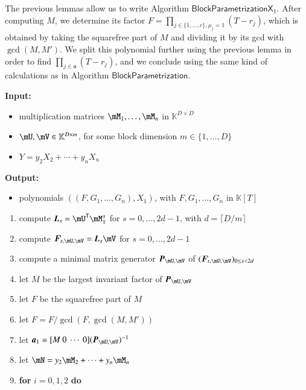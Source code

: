 \documentclass[final,1p,times,authoryear]{elsarticle}
\newcommand{\mat}[1]{\bm{\MakeUppercase{#1}}} %
\newcommand{\row}[1]{\bm{\MakeLowercase{#1}}} %
\newcommand{\seqelt}[1]{\bm{F}_{#1}} %
\newcommand{\mainalgoname}{\mathsf{ BlockParametrization}}
\newcommand{\mf}{Y}
\newcommand{\trsp}[1]{#1^{\mathsf{T}}} %
\def\K{\mathbb{K}}
\def\K {\ensuremath{\mathbb{K}}}
\newcommand{\mUt}{\trsp{\mU}}
\begin{document}
The previous lemmas allow us to write Algorithm
$\mathsf{BlockParametrizationX}_1$. After computing $M$, we determine its
factor $F=\prod_{j \in \{1,\dots,c\}, \mu_j=1} (T-r_j)$, which is
obtained by taking the squarefree part of $M$ and dividing it by
its gcd with $\gcd(M,M')$. We split this polynomial further using the previous
lemma in order to find $\prod_{j \in \mathfrak{a}} (T-r_j)$, and we
conclude using the same kind of calculations as in Algorithm
$\mainalgoname$.

\begin{algorithm}[ht]
  \caption{$\mainalgoname{\sf X}_1(\mM_1,\dots,\mM_n,\mU,\mV,\mf$)}
  {\bf Input:} \vspace{-0.5em}
  \begin{itemize}
    \item multiplication matrices $\mM_1,\dots,\mM_n$ in $\K^{D \times D}$
    \item  $\mU,\mV \in \mathbb{K}^{D \times m}$, for some block dimension  $m \in \{1,\dots,D\}$
    \item $\mf =y_2 X_2 + \cdots + y_n X_n$
  \end{itemize}
  {\bf Output:}  \vspace{-0.5em}
  \begin{itemize}
    \item polynomials $((F,G_1,\dots,G_n),X_1)$, with $F,G_1,\dots,G_n$ in $\K[T]$
  \end{itemize}
  \begin{enumerate}
    \item\label{X1step3} { compute $\mat{L}_s = \mUt\mM_1^s$ for $s=0,\dots,2d-1$, with $d = \lceil D/m \rceil$}
    \item\label{X1step4} { compute $\seqelt{s,\mU,\mV}= \mat{L}_s\mV$ for $s=0,\dots, 2d-1$}
    \item\label{X1step5} { compute a minimal matrix generator $\mat{P}_{\mU,\mV}$ of $(\seqelt{s,\mU,\mV})_{0 \le s < 2d}$}
    \item\label{X1step6} { let $M$ be the largest invariant factor of $\mat{P}_{\mU,\mV}$}
    \item\label{X1step7} { let $F$ be  the squarefree part  of $M$}
    \item\label{X1step7b} let $F = F /\gcd(F, \gcd (M, M'))$
    \item\label{X1step8} { let $\row{a}_1 = [M~0 ~\cdots~ 0] (\mat{P}_{\mU,\mV})^{-1}$}
    \item let $\mN = y_2 \mM_2 + \cdots+y_n \mM_n$
    \item \textbf{for} $i=0,1,2$ \textbf{do} \\

\end{enumerate}
\end{algorithm}
\end{document}
